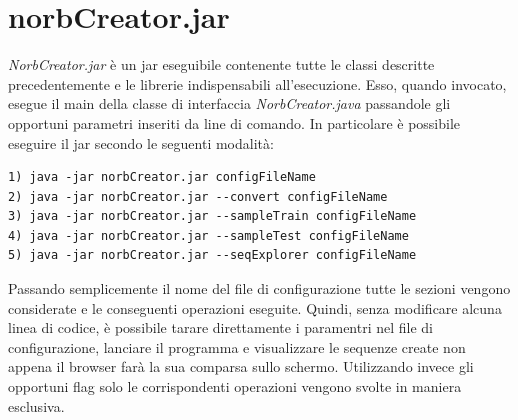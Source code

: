 \documentclass[paper=a4, fontsize=11pt]{scrartcl} %
\numberwithin{equation}{section} %
\numberwithin{figure}{section} %
\numberwithin{table}{section} %
\begin{document}
\section{norbCreator.jar}
\emph{NorbCreator.jar} è un jar eseguibile contenente tutte le classi descritte precedentemente e le librerie indispensabili all'esecuzione.  Esso, quando invocato, esegue il main della classe di interfaccia \emph{NorbCreator.java} passandole gli opportuni parametri inseriti da line di comando. 
In particolare è possibile eseguire il jar secondo le seguenti modalità:

\begin{lstlisting}
1) java -jar norbCreator.jar configFileName
2) java -jar norbCreator.jar --convert configFileName
3) java -jar norbCreator.jar --sampleTrain configFileName
4) java -jar norbCreator.jar --sampleTest configFileName
5) java -jar norbCreator.jar --seqExplorer configFileName
\end{lstlisting}

Passando semplicemente il nome del file di configurazione tutte le sezioni vengono considerate e le conseguenti operazioni eseguite. Quindi, senza modificare alcuna linea di codice, è possibile tarare direttamente i paramentri nel file di configurazione, lanciare il programma e visualizzare le sequenze create non appena il browser farà la sua comparsa sullo schermo. 
Utilizzando invece gli opportuni flag solo le corrispondenti operazioni vengono svolte in maniera esclusiva.



\end{document}
